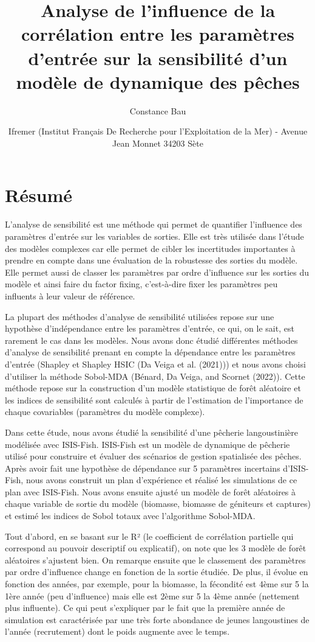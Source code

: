 \documentclass[
]{article}
\title{Analyse de l'influence de la corrélation entre les paramètres
d'entrée sur la sensibilité d'un modèle de dynamique des pêches}
\author{Constance Bau}
\date{Ifremer (Institut Français De Recherche pour l'Exploitation de la
Mer) - Avenue Jean Monnet 34203 Sète}
\begin{document}
\maketitle

{
\setcounter{tocdepth}{2}
\tableofcontents
}
\hypertarget{ruxe9sumuxe9}{%
\section{Résumé}\label{ruxe9sumuxe9}}

L'analyse de sensibilité est une méthode qui permet de quantifier
l'influence des paramètres d'entrée sur les variables de sorties. Elle
est très utilisée dans l'étude des modèles complexes car elle permet de
cibler les incertitudes importantes à prendre en compte dans une
évaluation de la robustesse des sorties du modèle. Elle permet aussi de
classer les paramètres par ordre d'influence sur les sorties du modèle
et ainsi faire du factor fixing, c'est-à-dire fixer les paramètres peu
influents à leur valeur de référence.

La plupart des méthodes d'analyse de sensibilité utilisées repose sur
une hypothèse d'indépendance entre les paramètres d'entrée, ce qui, on
le sait, est rarement le cas dans les modèles. Nous avons donc étudié
différentes méthodes d'analyse de sensibilité prenant en compte la
dépendance entre les paramètres d'entrée (Shapley et Shapley HSIC (Da
Veiga et al. (2021))) et nous avons choisi d'utiliser la méthode
Sobol-MDA (Bénard, Da Veiga, and Scornet (2022)). Cette méthode repose
sur la construction d'un modèle statistique de forêt aléatoire et les
indices de sensibilité sont calculés à partir de l'estimation de
l'importance de chaque covariables (paramètres du modèle complexe).

Dans cette étude, nous avons étudié la sensibilité d'une pêcherie
langoustinière modélisée avec ISIS-Fish. ISIS-Fish est un modèle de
dynamique de pêcherie utilisé pour construire et évaluer des scénarios
de gestion spatialisée des pêches. Après avoir fait une hypothèse de
dépendance sur 5 paramètres incertains d'ISIS-Fish, nous avons construit
un plan d'expérience et réalisé les simulations de ce plan avec
ISIS-Fish. Nous avons ensuite ajusté un modèle de forêt aléatoires à
chaque variable de sortie du modèle (biomasse, biomasse de géniteurs et
captures) et estimé les indices de Sobol totaux avec l'algorithme
Sobol-MDA.

Tout d'abord, en se basant sur le R² (le coefficient de corrélation
partielle qui correspond au pouvoir descriptif ou explicatif), on note
que les 3 modèle de forêt aléatoires s'ajustent bien. On remarque
ensuite que le classement des paramètres par ordre d'influence change en
fonction de la sortie étudiée. De plus, il évolue en fonction des
années, par exemple, pour la biomasse, la fécondité est 4ème sur 5 la
1ère année (peu d'influence) mais elle est 2ème sur 5 la 4ème année
(nettement plus influente). Ce qui peut s'expliquer par le fait que la
première année de simulation est caractérisée par une très forte
abondance de jeunes langoustines de l'année (recrutement) dont le poids
augmente avec le temps.
\end{document}
